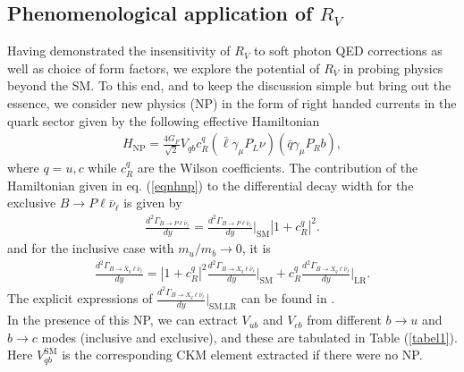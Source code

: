 \documentclass[a4paper,11pt]{article}
\begin{document}
	 \subsection{Phenomenological application of $R_V$}
   Having demonstrated the insensitivity of $R_V $ to soft photon QED corrections as well as choice of form factors, we explore the 
   potential of $R_V$ in probing physics beyond the SM. To this end, and to keep the discussion simple but bring out the essence, 
   we consider new physics (NP) in the form of right handed currents in the quark sector given by the following effective Hamiltonian 
    \begin{eqnarray}
    H_{\text{NP}}=\frac{4G_F}{\sqrt{2}}V_{qb} c_R^q (\bar{\ell}\gamma_{\mu} P_L \nu)\left( \bar{q}\gamma_{\mu} P_R b \right),
    \label{eqnhnp}
    \end{eqnarray}
    where $q=u,c$ while $c_R^q$ are the Wilson coefficients. The contribution of the Hamiltonian given in eq. (\ref{eqnhnp}) to the differential decay width for the exclusive $B\to P \ell \bar{\nu}_{\ell}$ is given by 
    \begin{eqnarray}
    	\frac{d^{2}\Gamma_{B\to P \ell \bar{\nu}_{\ell}}}{dy}=\frac{d^{2}\Gamma_{B\to P \ell \bar{\nu}_{\ell}}}{dy}\Big|_{\text{SM}} |1+c_R^q|^2.
    \end{eqnarray}
    and for the inclusive case with $m_u/m_b \to 0$, it is
    \begin{eqnarray}
    	\frac{d^{2}\Gamma_{B\to X_q \ell \bar{\nu}_{\ell}}}{dy}=|1+c_R^q|^2\frac{d^{2}\Gamma_{B\to X_q \ell \bar{\nu}_{\ell}}}{dy}\Big|_{\text{SM}} +c_R^q\frac{d^{2}\Gamma_{B\to X_q \ell \bar{\nu}_{\ell}}}{dy}\Big|_{\text{LR}}.
    \end{eqnarray}
    The explicit expressions of $\frac{d^{2}\Gamma_{B\to X_q \ell \bar{\nu}_{\ell}}}{dy}\Big|_{\text{SM,LR}}$ can be found in 
    \cite{Dassinger:2008as,Kamali:2018bdp}.\\
    In the presence of this NP, we can extract $V_{ub}$ and $V_{cb}$ from different $b\to u$ and $b\to c$ modes (inclusive and exclusive), and these are tabulated in Table  (\ref{tabel1}). Here $V_{qb}^{\text{SM}}$ is the corresponding CKM element extracted if there were no NP.
\end{document}

